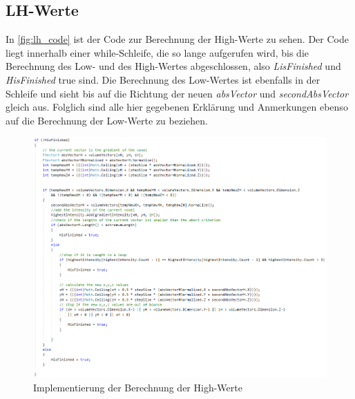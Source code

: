 \subsection{LH-Werte}

In \autoref{fig:lh_code} ist der Code zur Berechnung der High-Werte zu sehen. Der Code liegt innerhalb einer while-Schleife, die so lange aufgerufen wird, bis die Berechnung des Low- und des High-Wertes abgeschlossen, also \textit{LisFinished} und \textit{HisFinished} true sind.
\newline
Die Berechnung des Low-Wertes ist ebenfalls in der Schleife und sieht bis auf die Richtung der neuen \textit{absVector} und \textit{secondAbsVector} gleich aus. Folglich sind alle hier gegebenen Erklärung und Anmerkungen ebenso auf die Berechnung der Low-Werte zu beziehen.


\begin{figure}[!h] 
\includegraphics[width=1.2\textwidth]{Logos/LH_Code.PNG}
\caption{Implementierung der Berechnung der High-Werte} 
\label{fig:lh_code} 
\end{figure}


